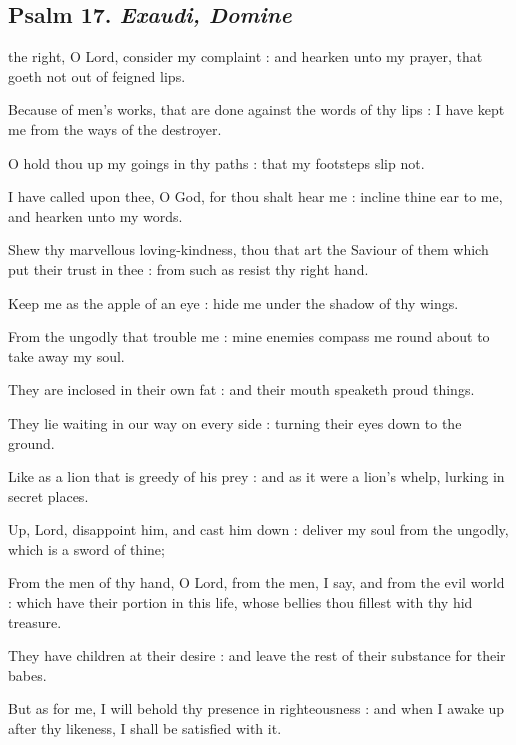 \clearpage
\subsection{Psalm 17. \textit{Exaudi, Domine}}

 the right, O Lord, consider my complaint : and hearken unto my prayer, that goeth not out of feigned lips.\par
{}
Because of men's works, that are done against the words of thy lips : I have kept me from the ways of the destroyer.\par
{}O hold thou up my goings in thy paths : that my footsteps slip not.\par
{}I have called upon thee, O God, for thou shalt hear me : incline thine ear to me, and hearken unto my words.\par
{}Shew thy marvellous loving-kindness, thou that art the Saviour of them which put their trust in thee : from such as resist thy right hand.\par
{}Keep me as the apple of an eye : hide me under the shadow of thy wings.\par
{}From the ungodly that trouble me : mine enemies compass me round about to take away my soul.\par
{}They are inclosed in their own fat : and their mouth speaketh proud things.\par
{}They lie waiting in our way on every side : turning their eyes down to the ground.\par
{}Like as a lion that is greedy of his prey : and as it were a lion's whelp, lurking in secret places.\par
{}Up, Lord, disappoint him, and cast him down : deliver my soul from the ungodly, which is a sword of thine;\par
{}From the men of thy hand, O Lord, from the men, I say, and from the evil world : which have their portion in this life, whose bellies thou fillest with thy hid treasure.\par
{}They have children at their desire : and leave the rest of their substance for their babes.\par
{}But as for me, I will behold thy presence in righteousness : and when I awake up after thy likeness, I shall be satisfied with it.\par

